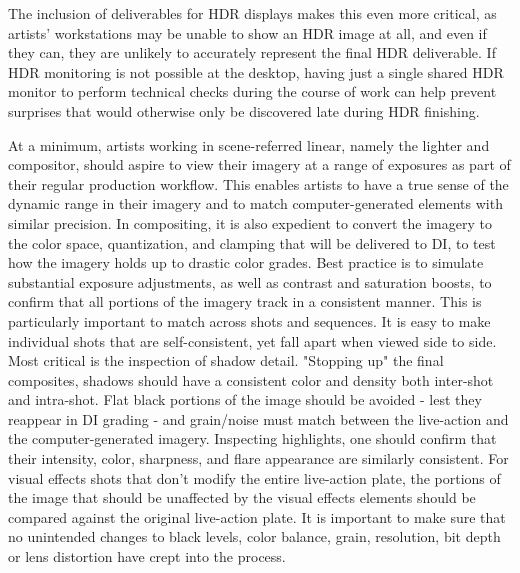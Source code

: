 The inclusion of deliverables for HDR displays makes this even more critical, as artists' workstations may be unable to show an HDR image at all, and even if they can, they are unlikely to accurately represent the final HDR deliverable. If HDR monitoring is not possible at the desktop, having just a single shared HDR monitor to perform technical checks during the course of work can help prevent surprises that would otherwise only be discovered late during HDR finishing.

At a minimum, artists working in scene-referred linear, namely the lighter and compositor, should aspire to view their imagery at a range of exposures as part of their regular production workflow. This enables artists to have a true sense of the dynamic range in their imagery and to match computer-generated elements with similar precision. In compositing, it is also expedient to convert the imagery to the color space, quantization, and clamping that will be delivered to DI, to test how the imagery holds up to drastic color grades. Best practice is to simulate substantial exposure adjustments, as well as contrast and saturation boosts, to confirm that all portions of the imagery track in a consistent manner. This is particularly important to match across shots and sequences. It is easy to make individual shots that are self-consistent, yet fall apart when viewed side to side. Most critical is the inspection of shadow detail. "Stopping up" the final composites, shadows should have a consistent color and density both inter-shot and intra-shot. Flat black portions of the image should be avoided - lest they reappear in DI grading - and grain/noise must match between the live-action and the computer-generated imagery. Inspecting highlights, one should confirm that their intensity, color, sharpness, and flare appearance are similarly consistent. For visual effects shots that don't modify the entire live-action plate, the portions of the image that should be unaffected by the visual effects elements should be compared against the original live-action plate. It is important to make sure that no unintended changes to black levels, color balance, grain, resolution, bit depth or lens distortion have crept into the process.

